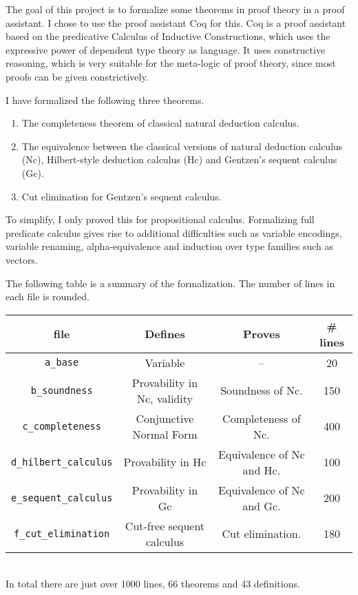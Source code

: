 \documentclass{article}
\begin{document}
The goal of this project is to formalize some theorems in proof theory in a proof assistant. I chose to use the proof assistant Coq\citep{Coq:manual} for this. Coq is a proof assistant based on the predicative Calculus of Inductive Constructions, which uses the expressive power of dependent type theory as language. It uses constructive reasoning, which is very suitable for the meta-logic of proof theory, since most proofs can be given constrictively.

I have formalized the following three theorems.
\begin{enumerate}
\item The completeness theorem of classical natural deduction calculus.
\item The equivalence between the classical versions of natural deduction calculus (Nc), Hilbert-style deduction calculus (Hc) and Gentzen's sequent calculus (Gc).
\item Cut elimination for Gentzen's sequent calculus.
\end{enumerate}
To simplify, I only proved this for propositional calculus. Formalizing full predicate calculus gives rise to additional difficulties such as variable encodings, variable renaming, alpha-equivalence and induction over type families such as vectors.

The following table is a summary of the formalization. The number of lines in each file is rounded.\\

\begin{tabular}{c|c|c|c}
\textbf{file} & \textbf{Defines} & \textbf{Proves} & \textbf{\# lines} \\ \hline
\verb"a_base" & Variable & -- & 20  \\
\verb"b_soundness" & Provability in Nc, validity & Soundness of Nc. & 150 \\
\verb"c_completeness" & Conjunctive Normal Form & Completeness of Nc. & 400 \\
\verb"d_hilbert_calculus" & Provability in Hc & Equivalence of Nc and Hc. & 100 \\
\verb"e_sequent_calculus" & Provability in Gc & Equivalence of Nc and Gc. & 200 \\
\verb"f_cut_elimination" & Cut-free sequent calculus & Cut elimination. & 180 \\
\end{tabular}\\

In total there are just over 1000 lines, 66 theorems and 43 definitions.
\end{document}
